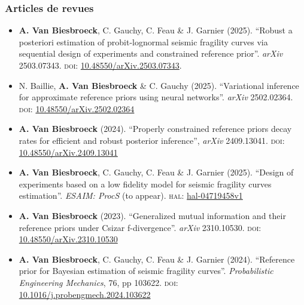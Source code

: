 \nocite{van_biesbroeck_design_2025,van_biesbroeck_generalized_2024,van_biesbroeck_influence_2023,van_biesbroeck_properly_2024,van_biesbroeck_reference_2024,baillie_variational_2025,baillie_bayesian_2025,van_biesbroeck_design_2025-1}


\subsubsection{Articles de revues}

\begin{itemize}
    \item \textbf{A. Van Biesbroeck}, C. Gauchy, C. Feau \& J. Garnier (2025). ``Robust a posteriori estimation of probit-lognormal seismic fragility curves via sequential design of experiments and constrained reference prior''. \emph{arXiv} 2503.07343. \textsc{doi:} \href{https://dx.doi.org/10.48550/arXiv.2503.07343}{10.48550/arXiv.2503.07343}.
    \item N. Baillie, \textbf{A. Van Biesbroeck} \& C. Gauchy (2025). ``Variational inference for approximate reference priors using neural networks''. \emph{arXiv} 2502.02364. \textsc{doi:} \href{https://dx.doi.org/10.48550/arXiv.2502.02364}{10.48550/arXiv.2502.02364}
    \item \textbf{A. Van Biesbroeck} (2024). ``Properly constrained reference priors decay rates for efficient and robust posterior inference'', \emph{arXiv} 2409.13041. \textsc{doi:} \href{https://dx.doi.org/10.48550/arXiv.2409.13041}{10.48550/arXiv.2409.13041}
    \item \textbf{A. Van Biesbroeck}, C. Gauchy, C. Feau \& J. Garnier (2025). ``Design of experiments based on a low fidelity model for seismic fragility curves estimation''. \emph{ESAIM: ProcS} (to appear). \textsc{hal:} \href{https://hal.science/hal-04719458v1}{hal-04719458v1}
    \item \textbf{A. Van Biesbroeck} (2023). ``Generalized mutual information and their reference priors under Csizar f-divergence''. \emph{arXiv} 2310.10530. \textsc{doi:} \href{https://dx.doi.org/10.48550/arXiv.2310.10530}{10.48550/arXiv.2310.10530}
    \item \textbf{A. Van Biesbroeck}, C. Gauchy, C. Feau \& J. Garnier (2024). ``Reference prior for Bayesian estimation of seismic fragility curves''. \emph{Probabilistic Engineering Mechanics}, 76, pp 103622. \textsc{doi:} \href{https://dx.doi.org/10.1016/j.probengmech.2024.103622}{10.1016/j.probengm\-ech.2024.103622}
\end{itemize}



